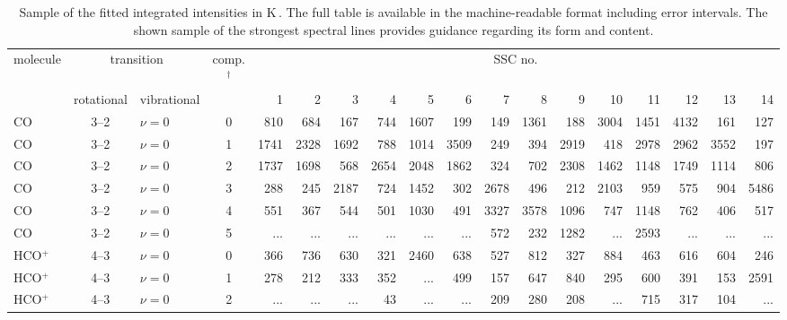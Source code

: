\begin{table}
\begin{threeparttable}
    \centering
    \footnotesize
    \caption[Fitted line intensities]{Sample of the fitted integrated intensities in K\,\kms. The full table is available in the machine-readable format including error intervals. The shown sample of the strongest spectral lines provides guidance regarding its form and content.
    \label{SSCs: table: intensities}}
    
    \begin{tabular}{lclcrrrrrrrrrrrrrr}
        \toprule
        molecule & \multicolumn{2}{c}{transition} & comp.$^\dagger$ & \multicolumn{14}{c}{SSC no.}\\ \cline{2-3} \cline{5-18}
        & rotational & vibrational & & 1 & 2 & 3 & 4 & 5 & 6 & 7 & 8 & 9 & 10 & 11 & 12 & 13 & 14\\
        \midrule
CO             & 3--2                     & $\nu=0$         & 0 &  810 &  684 &  167 &  744 & 1607 &  199 &  149 & 1361 &  188 & 3004 & 1451 & 4132 &  161 &  127 \\
CO             & 3--2                     & $\nu=0$         & 1 & 1741 & 2328 & 1692 &  788 & 1014 & 3509 &  249 &  394 & 2919 &  418 & 2978 & 2962 & 3552 &  197 \\
CO             & 3--2                     & $\nu=0$         & 2 & 1737 & 1698 &  568 & 2654 & 2048 & 1862 &  324 &  702 & 2308 & 1462 & 1148 & 1749 & 1114 &  806 \\
CO             & 3--2                     & $\nu=0$         & 3 &  288 &  245 & 2187 &  724 & 1452 &  302 & 2678 &  496 &  212 & 2103 &  959 &  575 &  904 & 5486 \\
CO             & 3--2                     & $\nu=0$         & 4 &  551 &  367 &  544 &  501 & 1030 &  491 & 3327 & 3578 & 1096 &  747 & 1148 &  762 &  406 &  517 \\
CO             & 3--2                     & $\nu=0$         & 5 &  ... &  ... &  ... &  ... &  ... &  ... &  572 &  232 & 1282 &  ... & 2593 &  ... &  ... &  ... \\
HCO$^+$        & 4--3                     & $\nu=0$         & 0 &  366 &  736 &  630 &  321 & 2460 &  638 &  527 &  812 &  327 &  884 &  463 &  616 &  604 &  246 \\
HCO$^+$        & 4--3                     & $\nu=0$         & 1 &  278 &  212 &  333 &  352 &  ... &  499 &  157 &  647 &  840 &  295 &  600 &  391 &  153 & 2591 \\
HCO$^+$        & 4--3                     & $\nu=0$         & 2 &  ... &  ... &  ... &   43 &  ... &  ... &  209 &  280 &  208 &  ... &  715 &  317 &  104 &  ... \\

\end{tabular}
\end{threeparttable}
\end{table}
